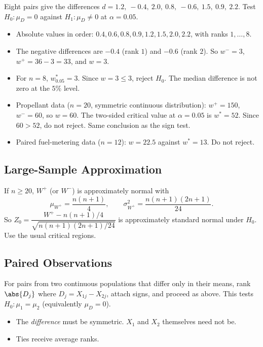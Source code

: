 \begin{example}\label{ex:wilcoxon}
Eight pairs give the differences $d=1.2,\ -0.4,\ 2.0,\ 0.8,\ -0.6,\ 1.5,\ 0.9,\ 2.2$. Test $H_0:\mu_D=0$ against $H_1:\mu_D\ne0$ at $\alpha=0.05$.
\begin{itemize}
  \item Absolute values in order: $0.4,0.6,0.8,0.9,1.2,1.5,2.0,2.2$, with ranks $1,\dots,8$.
  \item The negative differences are $-0.4$ (rank $1$) and $-0.6$ (rank $2$). So $w^-=3$, $w^+=36-3=33$, and $w=3$.
  \item For $n=8$, $w^*_{0.05}=3$. Since $w=3\le3$, reject $H_0$. The median difference is not zero at the $5\%$ level.
\end{itemize}
\end{example}

\begin{example}
\begin{itemize}
  \item Propellant data ($n=20$, symmetric continuous distribution): $w^+=150$, $w^-=60$, so $w=60$. The two-sided critical value at $\alpha=0.05$ is $w^*=52$. Since $60>52$, do not reject. Same conclusion as the sign test.
  \item Paired fuel-metering data ($n=12$): $w=22.5$ against $w^*=13$. Do not reject.
\end{itemize}
\end{example}

\subsection{Large-Sample Approximation}

If $n\ge20$, $W^+$ (or $W^-$) is approximately normal with
\[ \mu_{W^+}=\frac{n(n+1)}4,\qquad\sigma^2_{W^+}=\frac{n(n+1)(2n+1)}{24}. \]
So $Z_0=\dfrac{W^+-n(n+1)/4}{\sqrt{n(n+1)(2n+1)/24}}$ is approximately standard normal under $H_0$. Use the usual critical regions.

\subsection{Paired Observations}

For pairs from two continuous populations that differ only in their means, rank $\abs{D_j}$ where $D_j=X_{1j}-X_{2j}$, attach signs, and proceed as above. This tests $H_0:\mu_1=\mu_2$ (equivalently $\mu_D=0$).
\begin{itemize}
  \item The \emph{difference} must be symmetric. $X_1$ and $X_2$ themselves need not be.
  \item Ties receive average ranks.
\end{itemize}

